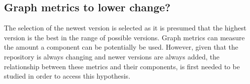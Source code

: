 % 
% 
% 
% 
% 
% 
% 
% 

\subsection{Graph metrics to lower change?}
The selection of the newest version is selected as it is presumed that the highest version is the best in the range of possible versions.
Graph metrics can measure the amount a component can be potentially be used.
However, given that the repository is always changing and newer versions are always added, the relationship between these metrics and their components,
is first needed to be studied in order to access this hypothesis.

